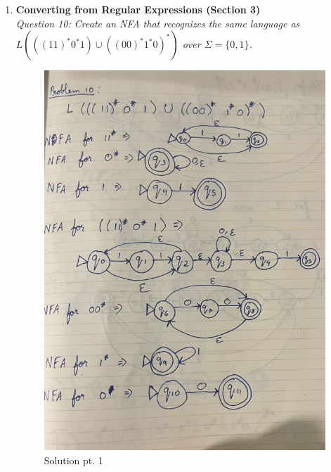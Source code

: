 \documentclass[10pt,letterpaper,unboxed,cm]{article}
\begin{document}
\begin{enumerate}
\pagebreak

\item \textbf{Converting from Regular Expressions (Section 3)} \\
\emph{Question 10: Create an NFA that recognizes the same language as $L(((11)^*0^*1)\cup((00)^*1^*0)^*)$ over $\Sigma=\{0,1\}$.}

\begin{figure}[h]
    \centering
    \includegraphics[width=0.75\linewidth]{images/hw3q10p1.jpg}
    \caption{Solution pt. 1}
    \label{fig:placeholder}
\end{figure}

\pagebreak


\end{enumerate}
\end{document}
